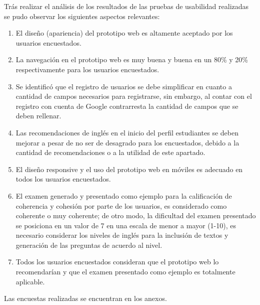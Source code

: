 \documentclass[../Main.tex]{subfiles}
\begin{document}
    \begin{justify}
    Trás realizar el análisis de los resultados de las pruebas de usabilidad realizadas se pudo observar los siguientes aspectos relevantes:
    
    \begin{enumerate}
        \item El diseño (apariencia) del prototipo web es altamente aceptado por los usuarios encuestados.
        \item La navegación en el prototipo web es muy buena y buena en un 80\% y 20\% respectivamente para los usuarios encuestados.
        \item Se identificó que el registro de usuarios se debe simplificar en cuanto a cantidad de campos necesarios para registrarse, sin embargo, al contar con el registro con cuenta de Google contrarresta la cantidad de campos que se deben rellenar.
        \item Las recomendaciones de inglés en el inicio del perfil estudiantes se deben mejorar a pesar de no ser de desagrado para los encuestados, debido a la cantidad de recomendaciones o a la utilidad de este apartado.
        \item El diseño responsive y el uso del prototipo web en móviles es adecuado en todos los usuarios encuestados.
        \item El examen generado y presentado como ejemplo para la calificación de coherencia y cohesión por parte de los usuarios, es considerado como coherente o muy coherente; de otro modo, la dificultad del examen presentado se posiciona en un valor de 7 en una escala de menor a mayor (1-10), es necesario considerar los niveles de inglés para la inclusión de textos y generación de las preguntas de acuerdo al nivel.
        
        \item Todos los usuarios encuestados consideran que el prototipo web lo recomendarían y que el examen presentado como ejemplo es totalmente aplicable.
    \end{enumerate}
    \end{justify}
    
    \begin{justify}
        Las encuestas realizadas se encuentran en los anexos.
    \end{justify}
\end{document}
